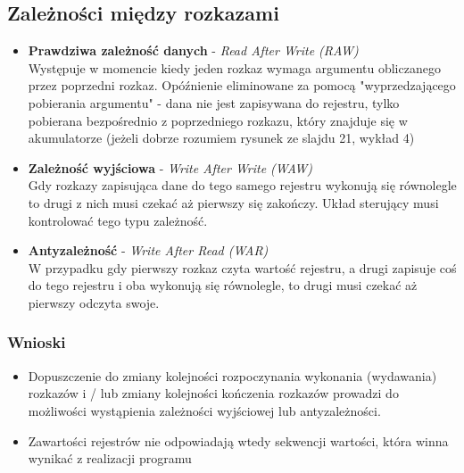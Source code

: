         \subsection*{Zależności między rozkazami}
        	\begin{itemize}
	            \item \textbf{Prawdziwa zależność danych} - \emph{Read After Write (RAW)}\\
	            Występuje w momencie kiedy jeden rozkaz wymaga argumentu obliczanego przez poprzedni rozkaz. Opóźnienie eliminowane za pomocą "wyprzedzającego pobierania argumentu" - dana nie jest zapisywana do rejestru, tylko pobierana bezpośrednio z poprzedniego rozkazu, który znajduje się w akumulatorze (jeżeli dobrze rozumiem rysunek ze slajdu 21, wykład 4)
	            \item \textbf{Zależność wyjściowa} - \emph{Write After Write (WAW)}\\
	            Gdy rozkazy zapisująca dane do tego samego rejestru wykonują się równolegle to drugi z nich musi czekać aż pierwszy się zakończy. Układ sterujący musi kontrolować tego typu zależność.
	            \item \textbf{Antyzależność} - \emph{Write After Read (WAR)}\\
	            W przypadku gdy pierwszy rozkaz czyta wartość rejestru, a drugi zapisuje coś do tego rejestru i oba wykonują się równolegle, to drugi musi czekać aż pierwszy odczyta swoje.
            \end{itemize}
            \subsubsection*{Wnioski}
            \begin{itemize}
            	\item Dopuszczenie do zmiany kolejności rozpoczynania wykonania (wydawania) rozkazów i / lub zmiany kolejności kończenia rozkazów prowadzi do możliwości wystąpienia zależności wyjściowej lub antyzależności.
            	\item Zawartości rejestrów nie odpowiadają wtedy sekwencji wartości, która winna wynikać z realizacji programu
            \end{itemize}
            
